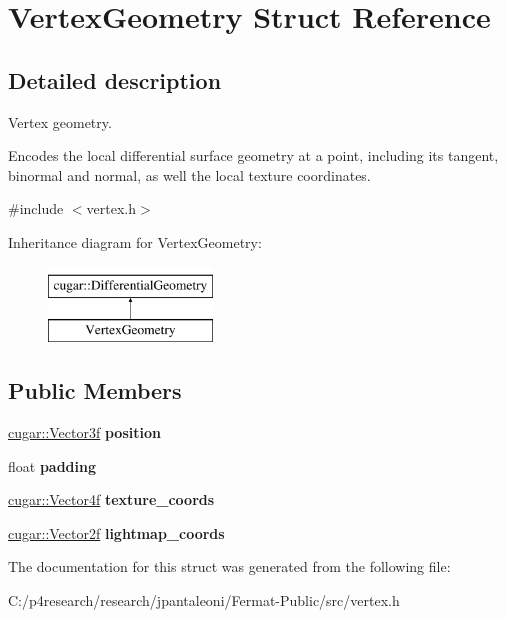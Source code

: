 \hypertarget{struct_vertex_geometry}{}\section{Vertex\+Geometry Struct Reference}
\label{struct_vertex_geometry}


\subsection{Detailed description}
Vertex geometry.

Encodes the local differential surface geometry at a point, including its tangent, binormal and normal, as well the local texture coordinates. 

{\ttfamily \#include $<$vertex.\+h$>$}

Inheritance diagram for Vertex\+Geometry\+:\begin{figure}[H]
\begin{center}
\leavevmode
\includegraphics[height=2.000000cm]{struct_vertex_geometry}
\end{center}
\end{figure}
\subsection*{Public Members}
\begin{DoxyCompactItemize}
\item 
\mbox{\label{struct_vertex_geometry_a61dd2bc82878e860f7aba3c76fe05d4c}} 
\hyperlink{structcugar_1_1_vector}{cugar\+::\+Vector3f} {\bfseries position}
\item 
\mbox{\label{struct_vertex_geometry_a3dfacc157d89c9e7d8415029d7273aa1}} 
float {\bfseries padding}
\item 
\mbox{\label{struct_vertex_geometry_a1f461aeb9d8c2ca16daa8f8c38e582e8}} 
\hyperlink{structcugar_1_1_vector}{cugar\+::\+Vector4f} {\bfseries texture\+\_\+coords}
\item 
\mbox{\label{struct_vertex_geometry_a0676110b727e9ebb4311d471e587829f}} 
\hyperlink{structcugar_1_1_vector}{cugar\+::\+Vector2f} {\bfseries lightmap\+\_\+coords}
\end{DoxyCompactItemize}


The documentation for this struct was generated from the following file\+:\begin{DoxyCompactItemize}
\item 
C\+:/p4research/research/jpantaleoni/\+Fermat-\/\+Public/src/vertex.\+h\end{DoxyCompactItemize}
